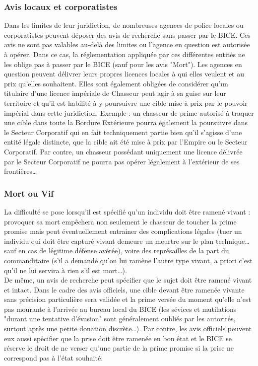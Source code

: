 \documentclass[twoside]{article}
\begin{document}
\subsubsection{Avis locaux et corporatistes}
Dans les limites de leur juridiction, de nombreuses agences de police locales ou corporatistes peuvent déposer des avis de recherche sans passer par le BICE. Ces avis ne sont pas valables au-delà des limites ou l'agence en question est autorisée à opérer. Dans ce cas, la réglementation appliquée par ces différentes entités ne les oblige pas à passer par le BICE (sauf pour les avis "Mort"). Les agences en question peuvent délivrer leurs propres licences locales à qui elles veulent et au prix qu’elles souhaitent. Elles sont également obligées de considérer qu'un titulaire d'une licence impériale de Chasseur peut agir à sa guise sur leur territoire et qu'il est habilité à y poursuivre une cible mise à prix par le pouvoir impérial dans cette juridiction. Exemple : un chasseur de prime autorisé à traquer une cible dans toute la Bordure Extérieure pourra également la poursuivre dans le Secteur Corporatif qui en fait techniquement partie bien qu'il s'agisse d'une entité légale distincte, que la cible ait été mise à prix par l'Empire ou le Secteur Corporatif. Par contre, un chasseur possédant uniquement une licence délivrée par le Secteur Corporatif ne pourra pas opérer légalement à l'extérieur de ses frontières\ldots

\subsubsection{Mort ou Vif}
La difficulté se pose lorsqu'il est spécifié qu'un individu doit être ramené vivant : provoquer sa mort empêchera non seulement le chasseur de toucher la prime promise mais peut éventuellement entrainer des complications légales (tuer un individu qui doit être capturé vivant demeure un meurtre sur le plan technique\ldots sauf en cas de légitime défense avérée), voire des représailles de la part du commanditaire (s'il a demandé qu'on lui ramène l'autre type vivant, a priori c'est qu'il ne lui servira à rien s'il est mort\ldots).\\

De même, un avis de recherche peut spécifier que le sujet doit être ramené vivant et intact. Dans le cadre des avis officiels, une cible devant être ramenée vivante sans précision particulière sera validée et la prime versée du moment qu'elle n'est pas mourante à l'arrivée au bureau local du BICE (les sévices et mutilations "durant une tentative d'évasion" sont généralement oubliés par les autorités, surtout après une petite donation discrète\ldots). Par contre, les avis officiels peuvent eux aussi spécifier que la prise doit être ramenée en bon état et le BICE se réserve le droit de ne verser qu'une partie de la prime promise si la prise ne correspond pas à l'état souhaité.\\
\end{document}
